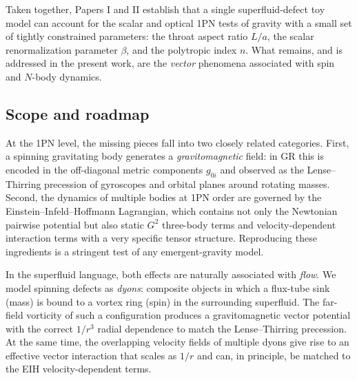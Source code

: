 \documentclass[11pt]{article}
\begin{document}
Taken together, Papers I and II establish that a single superfluid-defect toy
model can account for the scalar and optical 1PN tests of gravity with a small
set of tightly constrained parameters: the throat aspect ratio $L/a$, the scalar
renormalization parameter $\beta$, and the polytropic index $n$.
What remains, and is addressed in the present work, are the \emph{vector}
phenomena associated with spin and $N$-body dynamics.

\subsection{Scope and roadmap}
\label{subsec:intro-roadmap}

At the 1PN level, the missing pieces fall into two closely related categories.
First, a spinning gravitating body generates a \emph{gravitomagnetic} field:
in GR this is encoded in the off-diagonal metric components $g_{0i}$ and
observed as the Lense--Thirring precession of gyroscopes and orbital planes
around rotating masses.
Second, the dynamics of multiple bodies at 1PN order are governed by the
Einstein--Infeld--Hoffmann Lagrangian, which contains not only the Newtonian
pairwise potential but also static $G^2$ three-body terms and velocity-dependent
interaction terms with a very specific tensor structure.
Reproducing these ingredients is a stringent test of any emergent-gravity model.

In the superfluid language, both effects are naturally associated with
\emph{flow}.
We model spinning defects as \emph{dyons}: composite objects in which a
flux-tube sink (mass) is bound to a vortex ring (spin) in the surrounding
superfluid.
The far-field vorticity of such a configuration produces a gravitomagnetic
vector potential with the correct $1/r^3$ radial dependence to match the
Lense--Thirring precession.
At the same time, the overlapping velocity fields of multiple dyons give rise
to an effective vector interaction that scales as $1/r$ and can, in principle,
be matched to the EIH velocity-dependent terms.
\end{document}
